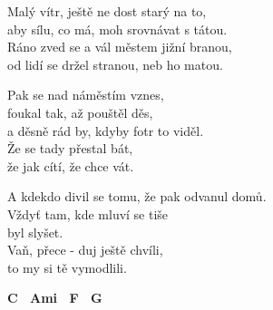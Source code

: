 
\re{}
Malý vítr, ještě ne dost starý na to,\\ 
aby sílu, co má, moh srovnávat s tátou.\\
Ráno zved se a vál městem jižní branou,\\ 
od lidí se držel stranou, neb ho matou.

\re{}
Pak se nad náměstím vznes,\\
foukal tak, až pouštěl děs,\\
a děsně rád by, kdyby fotr to viděl.\\
Že se tady přestal bát,\\
že jak cítí, že chce vát.

\re{}
A kdekdo divil se tomu, že pak odvanul domů.\\
Vždyť tam, kde mluví se tiše\\
byl slyšet.\\
Vaň, přece - duj ještě chvíli,\\
to my si tě vymodlili.

\textbf{{\footnotesize C \ Ami \ F \ G}}

\esong{}